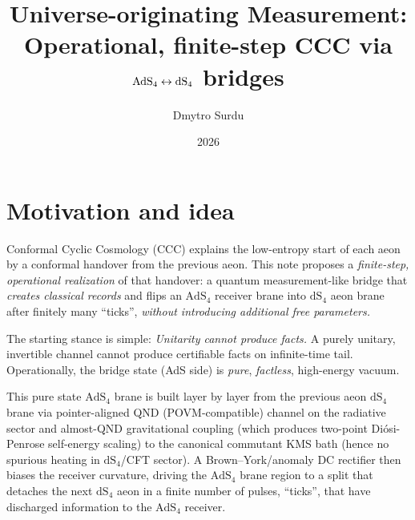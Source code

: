 \documentclass[10.5pt,a4paper]{article}
\title{\vspace{-1em}\textbf{Universe-originating Measurement:\\
Operational, finite-step CCC via $\AdS_4\leftrightarrow\dS_4$ bridges}\vspace{0.25em}}
\author{\normalsize Dmytro Surdu}
\date{\normalsize 2026}
\newcommand{\AdS}{\mathrm{AdS}}
\newcommand{\dS}{\mathrm{dS}}
\begin{document}
\maketitle
\vspace{-2.0em}

\section*{Motivation and idea}\label{sec:uom-summary-001}
Conformal Cyclic Cosmology (CCC) explains the low-entropy start of each aeon by a conformal handover from the previous aeon. This note proposes a \emph{finite-step, operational realization} of that handover: a quantum measurement-like bridge that \emph{creates classical records} and flips an $\AdS_4$ receiver brane into $\dS_4$ aeon brane after finitely many ``ticks'', \emph{without introducing additional free parameters.} 

The starting stance is simple: \emph{Unitarity cannot produce facts.} A purely unitary, invertible channel cannot produce certifiable facts on infinite-time tail. Operationally, the bridge state (AdS side) is \emph{pure}, \emph{factless}, high-energy vacuum.

This pure state $\AdS_4$ brane is built layer by layer from the previous aeon $\dS_4$ brane via pointer-aligned QND (POVM-compatible) channel on the radiative sector and almost-QND gravitational coupling (which produces two-point Diósi-Penrose self-energy scaling) to the canonical commutant KMS bath (hence no spurious heating in $\dS_4$/CFT sector). A Brown–York/anomaly DC rectifier then biases the receiver curvature, driving the $\AdS_4$ brane region to a split that detaches the next $\dS_4$ aeon in a finite number of pulses, “ticks”, that have discharged information to the $\AdS_4$ receiver. 

\vspace{0.55em}
\noindent{}
\vspace{0.15em}
\end{document}
